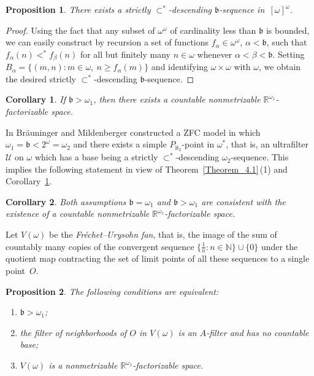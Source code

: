 \documentclass[a4paper,12pt]{amsart}
\newtheorem{proposition}{Proposition}[section]
\newtheorem{corollary}{Corollary}[section]
\theoremstyle{definition}
\theoremstyle{remark}
\begin{document}
\begin{proposition}
There exists a strictly $\subset^*$-de\-scend\-ing $\mathfrak b$-sequence in~$[\omega]^\omega$.
\end{proposition}

\begin{proof}
Using the fact that any subset of $\omega^\omega$ of cardinality less than $\mathfrak b$ is bounded, we can 
easily construct by recursion a set of functions $f_\alpha\in \omega^\omega$, $\alpha<\mathfrak b$, such that 
$f_\alpha(n) <^* f_\beta(n)$ for all but finitely many $n\in \omega$ whenever $\alpha<\beta<\mathfrak b$. Setting $B_\alpha=\{(m,n): m\in \omega,\ n\ge 
f_\alpha(m)\}$ and identifying $\omega\times \omega$ with $\omega$, we obtain the desired strictly 
$\subset^*$-de\-scend\-ing $\mathfrak b$-sequence. 
\end{proof}

\begin{corollary}
\label{Corollary_4.2}
If $\mathfrak b>\omega_1$, then there exists a countable nonmetrizable $\mathbb R^{\omega_1}$-factorizable space.
\end{corollary}

In \cite{B-M} Br\"auninger and Mildenberger constructed a ZFC model in which $\omega_1=\mathfrak 
b<2^\omega=\omega_2$ and there exists a simple $P_{\aleph_2}$-point in $\omega^*$, that is, an ultrafilter 
$\mathscr U$ on $\omega$ which has a base being a strictly $\subset^*$-descending $\omega_2$-sequence. 
This implies the following statement in view of Theorem~\ref{Theorem_4.1}\,(1) and Corollary~\ref{Corollary_4.2}.

\begin{corollary}
\label{Corollary_4.3}
Both assumptions $\mathfrak b=\omega_1$ and $\mathfrak b>\omega_1$ are consistent with the existence of a 
countable nonmetrizable $\mathbb R^{\omega_1}$-factorizable space.
\end{corollary}

Let $V(\omega)$ be the \emph{Fr\'echet--Urysohn fan}, that is, the image of the sum of countably many copies of 
the convergent sequence $\{\frac 1n: n\in \mathbb N\}\cup \{0\}$ under the quotient map contracting the set of 
limit points of all these sequences to a single point~$O$. 

\begin{proposition}
\label{Proposition_4.4}
The following conditions are equivalent:
\begin{enumerate}
\item[\rm(1)]
$\mathfrak b>\omega_1$\textup;
\item[\rm(2)]
the filter of neighborhoods of $O$ in $V(\omega)$ is an $A$-filter and has no countable base;
\item[\rm(3)]
$V(\omega)$ is a nonmetrizable $\mathbb R^{\omega_1}$-factorizable space.
\end{enumerate}
\end{proposition}
\end{document}
